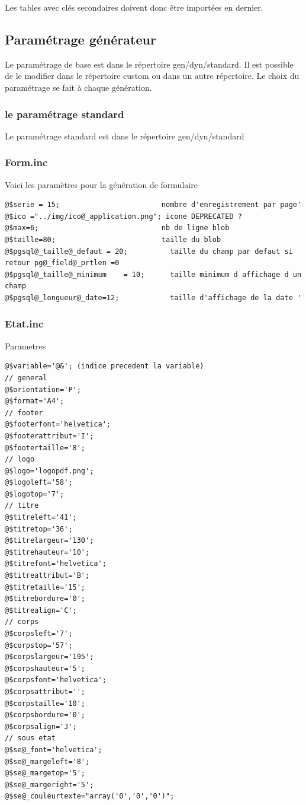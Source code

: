 \documentclass[letterpaper,10pt,french]{manual}
\begin{document}
Les tables avec clés secondaires doivent donc être importées en dernier.

\resetcurrentobjects
\hypertarget{--doc-generateur/parametrage_generateur}{}

\hypertarget{parametrage-generateur}{}\subsection{Paramétrage générateur}

Le paramétrage de base est dans le répertoire gen/dyn/standard.
Il est possible de le modifier dans le répertoire custom ou dans un autre répertoire.
Le choix du paramétrage se fait à chaque génération.


\subsubsection{le paramétrage standard}

Le paramétrage standard est dans le répertoire gen/dyn/standard


\subsubsection{Form.inc}

Voici les paramètres pour la génération de formulaire

\begin{Verbatim}[commandchars=@\[\]]
@$serie = 15;                        nombre d'enregistrement par page'
@$ico ="../img/ico@_application.png"; icone DEPRECATED ?
@$max=6;                             nb de ligne blob
@$taille=80;                         taille du blob
@$pgsql@_taille@_defaut = 20;          taille du champ par defaut si retour pg@_field@_prtlen =0
@$pgsql@_taille@_minimum    = 10;      taille minimum d affichage d un champ
@$pgsql@_longueur@_date=12;            taille d'affichage de la date '
\end{Verbatim}


\subsubsection{Etat.inc}

Parametres

\begin{Verbatim}[commandchars=@\[\]]
@$variable='@&'; (indice precedent la variable)
// general
@$orientation='P';
@$format='A4';
// footer
@$footerfont='helvetica';
@$footerattribut='I';
@$footertaille='8';
// logo
@$logo='logopdf.png';
@$logoleft='58';
@$logotop='7';
// titre
@$titreleft='41';
@$titretop='36';
@$titrelargeur='130';
@$titrehauteur='10';
@$titrefont='helvetica';
@$titreattribut='B';
@$titretaille='15';
@$titrebordure='0';
@$titrealign='C';
// corps
@$corpsleft='7';
@$corpstop='57';
@$corpslargeur='195';
@$corpshauteur='5';
@$corpsfont='helvetica';
@$corpsattribut='';
@$corpstaille='10';
@$corpsbordure='0';
@$corpsalign='J';
// sous etat
@$se@_font='helvetica';
@$se@_margeleft='8';
@$se@_margetop='5';
@$se@_margeright='5';
@$se@_couleurtexte="array('0','0','0')";
\end{Verbatim}
\end{document}
